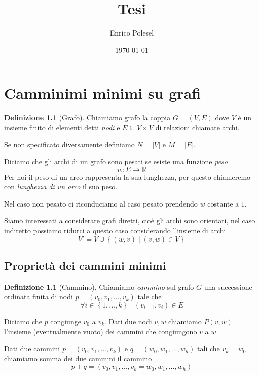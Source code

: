 \documentclass[a4paper,10pt]{amsbook}
\title{Tesi}
\author{Enrico Polesel}
\date{\today}
\newcounter{counter1}
\theoremstyle{plain}
\theoremstyle{definition}
\newtheorem{mydef}[counter1]{Definizione}
\theoremstyle{remark}
\newcommand{\set}[1]{\left\{#1\right\}}
\newcommand{\abs}[1]{\left|#1\right|}
\begin{document}
\maketitle

\setcounter{tocdepth}{5}

\tableofcontents

\chapter{Camminimi minimi su grafi}

\begin{mydef}[Grafo]
  Chiamiamo grafo la coppia $G = (V,E)$ dove $V$ è un insieme finito
  di elementi detti \textit{nodi} e $E\subseteq V \times V$ di
  relazioni chiamate archi.
\end{mydef}

Se non specificato diversamente definiamo $N = \abs{V}$ e $M =
\abs{E}$.

Diciamo che gli archi di un grafo sono pesati se esiste una funzione
\textit{peso}
\[ w : E \rightarrow \mathbb{R} \]
Per noi il peso di un arco rappresenta la sua lunghezza, per questo
chiameremo con \textit{lunghezza di un arco} il suo peso.

Nel caso non pesato ci riconduciamo al caso pesato prendendo $w$
costante a $1$.

Siamo interessati a considerare grafi diretti, cioè gli archi sono
orientati, nel caso indiretto possiamo ridurci a questo caso
considerando l'insieme di archi 
\[ V' = V \cup \set{ (w,v) \mid (v,w) \in V } \]

\section{Proprietà dei cammini minimi}

\begin{mydef}[Cammino]
  Chiamiamo \textit{cammino} sul grafo $G$ una successione ordinata
  finita di nodi $p = ( v_0, v_1, ..., v_k)$ tale che 
  \[ \forall i \in \set{ 1, ... , k} \;\;\; (v_{i-1}, v_{i} ) \in E\]
\end{mydef}

Diciamo che $p$ congiunge $v_0$ a $v_k$. Dati due nodi $v,w$ chiamiamo
$P(v,w)$ l'insieme (eventualmente vuoto) dei cammini che congiungono
$v$ a $w$

Dati due cammini $p = ( v_0, v_1, ..., v_k)$ e $q = ( w_0, w_1, ...,
w_{h})$ tali che $v_k = w_0$ chiamiamo somma dei due cammini il
cammino
\[ p+q = ( v_0, v_1, ..., v_k= w_0, w_1, ..., w_{h}) \]
\end{document}

